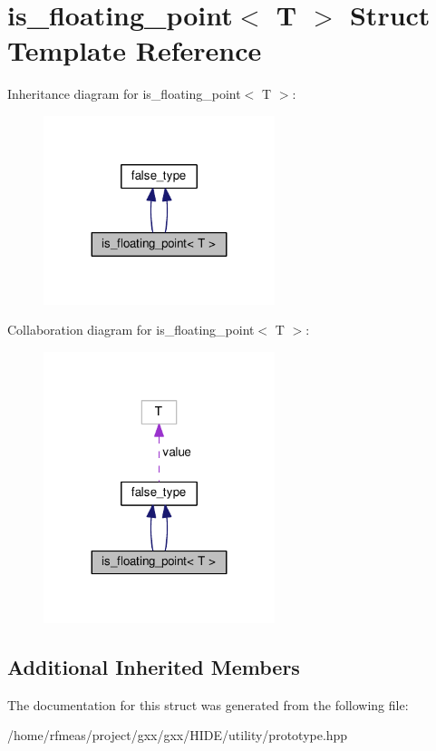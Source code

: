 \hypertarget{structis__floating__point}{}\section{is\+\_\+floating\+\_\+point$<$ T $>$ Struct Template Reference}
\label{structis__floating__point}


Inheritance diagram for is\+\_\+floating\+\_\+point$<$ T $>$\+:
\nopagebreak
\begin{figure}[H]
\begin{center}
\leavevmode
\includegraphics[width=191pt]{structis__floating__point__inherit__graph}
\end{center}
\end{figure}


Collaboration diagram for is\+\_\+floating\+\_\+point$<$ T $>$\+:
\nopagebreak
\begin{figure}[H]
\begin{center}
\leavevmode
\includegraphics[width=191pt]{structis__floating__point__coll__graph}
\end{center}
\end{figure}
\subsection*{Additional Inherited Members}


The documentation for this struct was generated from the following file\+:\begin{DoxyCompactItemize}
\item 
/home/rfmeas/project/gxx/gxx/\+H\+I\+D\+E/utility/prototype.\+hpp\end{DoxyCompactItemize}
